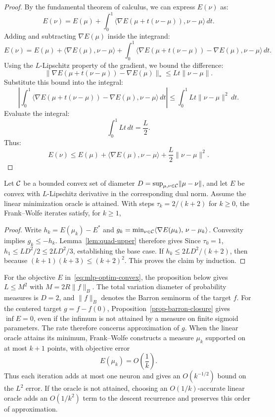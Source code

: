 \begin{proof}
By the fundamental theorem of calculus, we can express $E(\nu)$ as:
\[
E(\nu) = E(\mu) + \int_0^1 \langle \nabla E(\mu + t (\nu - \mu)), \nu - \mu \rangle \, dt.
\]
Adding and subtracting $\nabla E(\mu)$ inside the integrand:
\[
E(\nu) = E(\mu) + \langle \nabla E(\mu), \nu - \mu \rangle + \int_0^1 \langle \nabla E(\mu + t (\nu - \mu)) - \nabla E(\mu), \nu - \mu \rangle \, dt.
\]
Using the $L$-Lipschitz property of the gradient, we bound the difference:
\[
\|\nabla E(\mu + t (\nu - \mu)) - \nabla E(\mu)\|_* \leq L t \|\nu - \mu\|.
\]
Substitute this bound into the integral:
\[
\left| \int_0^1 \langle \nabla E(\mu + t (\nu - \mu)) - \nabla E(\mu), \nu - \mu \rangle \, dt \right| \leq \int_0^1 L t \|\nu - \mu\|^2 \, dt.
\]
Evaluate the integral:
\[
\int_0^1 L t \, dt = \frac{L}{2}.
\]
Thus:
\[
E(\nu) \leq E(\mu) + \langle \nabla E(\mu), \nu - \mu \rangle + \frac{L}{2} \|\nu - \mu\|^2.
\]
\end{proof}



\begin{thm}
Let $\mathcal{C}$ be a bounded convex set of diameter
$D=\sup_{\mu,\nu\in\mathcal{C}}\lVert\mu-\nu\rVert$, and let $E$ be convex with $L$-Lipschitz derivative in the corresponding dual norm. Assume the linear minimization oracle is attained. With steps $\tau_k=2/(k+2)$ for $k\geq0$, the Frank--Wolfe iterates satisfy, for $k\geq1$,
\end{thm}
\begin{proof}
Write $h_k=E(\mu_k)-E^*$ and
$g_k=\min_{\nu\in\mathcal{C}}\langle \nabla E(\mu_k),\,\nu-\mu_k\rangle$. Convexity implies $g_k\leq-h_k$. Lemma~\ref{lem:quad-upper} therefore gives
Since $\tau_0=1$, $h_1\leq LD^2/2\leq2LD^2/3$, establishing the base case. If $h_k\leq2LD^2/(k+2)$, then
because $(k+1)(k+3)\leq(k+2)^2$. This proves the claim by induction.
\end{proof}

For the objective $E$ in~\eqref{eq:mlp-optim-convex}, the proposition below gives $L\leq M^2$ with $M=2R\|f\|_B$. The total variation diameter of probability measures is $D=2$, and $\|f\|_B$ denotes the Barron seminorm of the target $f$.
%
For the centered target $g=f-f(0)$, Proposition~\ref{prop-barron-closure} gives $\inf E=0$, even if the infimum is not attained by a measure on finite sigmoid parameters. The rate therefore concerns approximation of $g$.
%
When the linear oracle attains its minimum, Frank--Wolfe constructs a measure $\mu_k$ supported on at most $k+1$ points, with objective error
\[
E(\mu_k) = O\left(\frac{1}{k}\right).
\]
Thus each iteration adds at most one neuron and gives an $O(k^{-1/2})$ bound on the $L^2$ error. If the oracle is not attained, choosing an $O(1/k)$-accurate linear oracle adds an $O(1/k^2)$ term to the descent recurrence and preserves this order of approximation.

